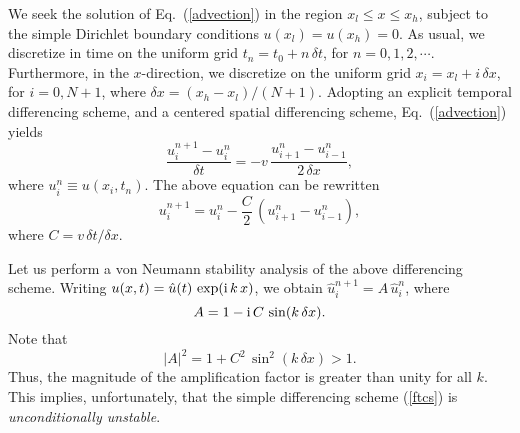 We seek the solution of Eq.~(\ref{advection}) in the region $x_l\leq x\leq x_h$,
subject to the simple Dirichlet boundary conditions $u(x_l) = u(x_h)=0$.
As usual, we discretize in time on the uniform grid $t_n=t_0+n\,\delta t$, for $n=0,1,2,\cdots$.
Furthermore, in the  $x$-direction, we discretize on the uniform grid $x_i = x_l + i\,\delta x$, for
$i=0,N+1$, where $\delta x = (x_h-x_l)/(N+1)$. Adopting an explicit temporal differencing
scheme, and  a centered spatial differencing scheme,  Eq.~(\ref{advection}) yields
\begin{equation}\label{ftcs1}
\frac{u_i^{n+1} - u_i^n}{\delta t} = - v\,\frac{u_{i+1}^n-u_{i-1}^n}{2\,\delta x},
\end{equation}
where $u_i^n\equiv u(x_i,t_n)$. The above equation can be rewritten
\begin{equation}\label{ftcs}
u_i^{n+1} = u_i^n -\frac{C}{2}\,(u_{i+1}^n-u_{i-1}^n),
\end{equation}
where $C= v\,\delta t/\delta x$.

Let us perform a von Neumann stability analysis of the above differencing scheme.
Writing $u(x,t)= \hat{u}(t)\,\exp ({\rm i}\,k\,x)$, we obtain
$\hat{u}_i^{n+1}=A\,\hat{u}_i^n$, where
\begin{equation}
A = 1 - {\rm i} \,C\,\sin (k \,\delta x).
\end{equation}
Note that 
\begin{equation}
|A|^2 = 1 + C^2\,\sin^2(k\,\delta x) > 1.
\end{equation}
Thus, the magnitude of the amplification factor is greater than unity for
all $k$. This implies, unfortunately, that the  simple differencing scheme (\ref{ftcs})
is {\em unconditionally unstable}.

